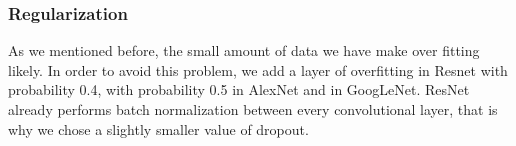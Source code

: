 \subsubsection{Regularization}
As we mentioned before, the small amount of data we have make over fitting likely. In order to avoid this problem, we add a layer of overfitting in Resnet with probability 0.4, with probability 0.5 in AlexNet and in GoogLeNet. ResNet already performs batch normalization between every convolutional layer, that is why we chose a slightly smaller value of dropout. 